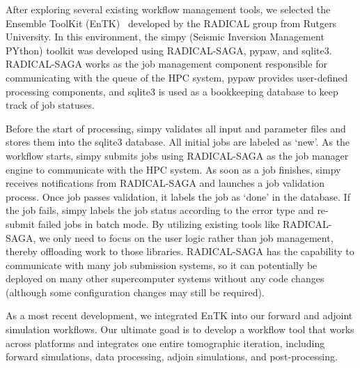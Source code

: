 After exploring several existing workflow management tools,
we selected the Ensemble ToolKit (EnTK)~\cite{EnTK2017} developed by the RADICAL
group from Rutgers University.
In this environment,
the simpy (Seismic Inversion Management PYthon) toolkit was developed using RADICAL-SAGA, pypaw, and sqlite3.
RADICAL-SAGA works as the 
job management component responsible for communicating with the queue of the HPC system,
pypaw provides user-defined processing components,
and sqlite3 is used as a bookkeeping database to keep track of job statuses.

Before the start of processing,
simpy validates all input and parameter files and stores them
into the sqlite3 database.
All initial jobs are labeled as `new'.
As the workflow starts, simpy submits jobs using 
RADICAL-SAGA as the job manager engine to communicate with the HPC system.
As soon as a job finishes, simpy receives notifications from
RADICAL-SAGA and launches a job validation process.
Once job passes validation,
it labels the job as `done' in the database.
If the job fails, simpy labels
the job status according to the error type and re-submit failed jobs in batch mode.
By utilizing existing tools like RADICAL-SAGA, we only need to focus on the user logic rather
than job management, thereby offloading work to those libraries.
RADICAL-SAGA has the capability to communicate with many job submission systems,
so it can potentially be deployed on many other supercomputer systems without any
code changes (although some configuration changes may still be required).

As a most recent development, we integrated EnTK
into our forward and adjoint simulation workflows. Our ultimate
goad is to develop a workflow tool that works across platforms and integrates one entire tomographic iteration, including forward simulations, data processing, adjoin simulations, and post-processing.
